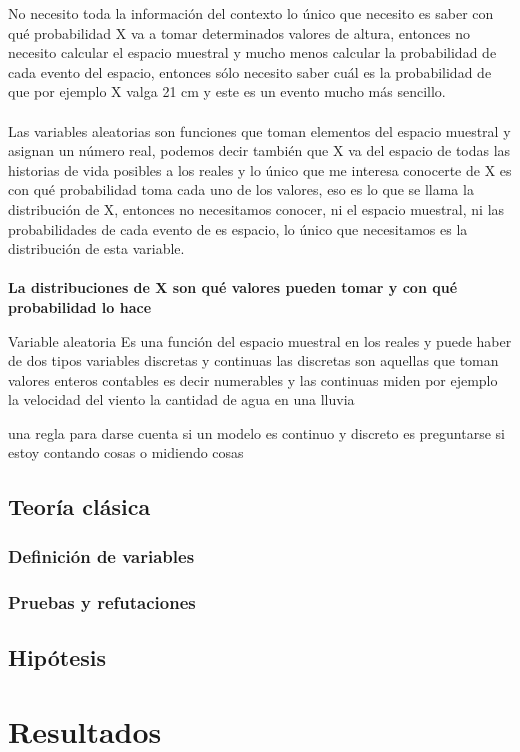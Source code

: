 \documentclass[12pt]{book}
\begin{document}
No necesito toda la información del contexto lo único que necesito es saber con qué probabilidad X va a tomar determinados valores de altura, entonces no necesito calcular el espacio muestral y mucho menos calcular la probabilidad de cada evento del espacio, entonces sólo necesito saber cuál es la probabilidad de que por ejemplo X valga 21 cm y este es un evento mucho más sencillo.
\\ \\
Las variables aleatorias son funciones que toman elementos del espacio muestral y asignan un número real, podemos decir también que X va del espacio de todas las historias de vida posibles a los reales y lo único que me interesa conocerte de X es con qué probabilidad toma cada uno de los valores, eso es lo que se llama la distribución de X, entonces no necesitamos conocer, ni el espacio muestral, ni las probabilidades de cada evento de es espacio, lo único que necesitamos es la distribución de esta variable.
\\ \\
\textbf{La distribuciones de X son qué valores pueden tomar y con qué probabilidad lo hace}

Variable aleatoria
Es una función del espacio muestral en los reales y puede haber de dos tipos variables discretas y continuas las discretas son aquellas que toman valores enteros contables es decir numerables y las continuas miden por ejemplo la velocidad del viento la cantidad de agua en una lluvia

una regla para darse cuenta si un modelo es continuo y discreto es preguntarse si estoy contando cosas o midiendo cosas

\section{Teoría clásica}
\subsection{Definición de variables}
\subsection{Pruebas y refutaciones}
\section{Hipótesis}
\chapter{Resultados}
\end{document}
